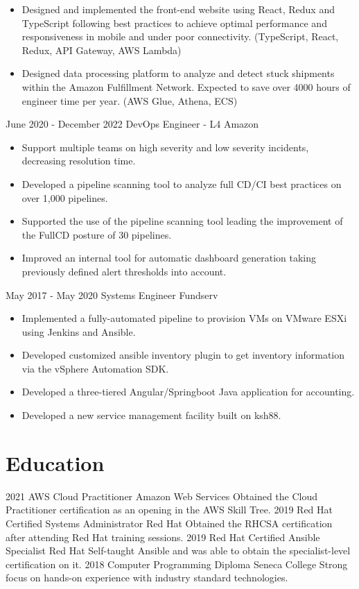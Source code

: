 \documentclass[]{friggeri-cv}
\begin{document}
\begin{entrylist}
{\begin{itemize}
        \item Designed and implemented the front-end website using React, Redux and TypeScript following best practices to achieve optimal performance and responsiveness in mobile and under poor connectivity. (TypeScript, React, Redux, API Gateway, AWS Lambda)
        \item Designed data processing platform to analyze and detect stuck shipments within the Amazon Fulfillment Network. Expected to save over 4000 hours of engineer time per year. (AWS Glue, Athena, ECS)
    \end{itemize}}
  \entry
    {June 2020 - December 2022}
    {DevOps Engineer - L4}
    {Amazon}
    {\begin{itemize}
        \item Support multiple teams on high severity and low severity incidents, decreasing resolution time.
        \item Developed a pipeline scanning tool to analyze full CD/CI best practices on over 1,000 pipelines.
        \item Supported the use of the pipeline scanning tool leading the improvement of the FullCD posture of 30 pipelines.
        \item Improved an internal tool for automatic dashboard generation taking previously defined alert thresholds into account.
    \end{itemize}}
  \entry
    {May 2017 - May 2020}
    {Systems Engineer}
    {Fundserv}
    {\begin{itemize}
        \item Implemented a fully-automated pipeline to provision VMs on VMware ESXi\\using Jenkins and Ansible.
        \item Developed customized ansible inventory plugin to get inventory information via the vSphere Automation SDK.
        \item Developed a three-tiered Angular/Springboot Java application for accounting.
        \item Developed a new service management facility built on ksh88.
    \end{itemize}}
\end{entrylist}

\section{Education}
\begin{entrylist}
  \entry
    {2021}
    {AWS Cloud Practitioner}
    {Amazon Web Services}
    {Obtained the Cloud Practitioner certification as an opening in the AWS Skill Tree.}
  \entry
    {2019}
    {Red Hat Certified Systems Administrator}
    {Red Hat}
    {Obtained the RHCSA certification after attending Red Hat training sessions.}
  \entry
    {2019}
    {Red Hat Certified Ansible Specialist}
    {Red Hat}
    {Self-taught Ansible and was able to obtain the specialist-level certification on it.}
  \entry
    {2018}
    {Computer Programming Diploma}
    {Seneca College}
    {Strong focus on hands-on experience with industry standard technologies.}
\end{entrylist}
\end{document}
